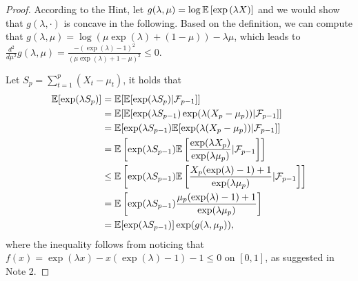 \begin{proof}

    According to the Hint, let $g(\lambda, \mu) = \log \mathbb{E} \left[\exp\left(\lambda X\right)\right]$ and we would show that $g(\lambda, \cdot)$ is concave in the following.
    Based on the definition, we can compute that $g(\lambda, \mu) = \log(\mu \exp(\lambda) + (1 - \mu)) - \lambda \mu$,
    which leads to $\frac{d^2}{d \mu^2} g(\lambda, \mu) = \frac{-(\exp(\lambda) - 1)^2}{(\mu \exp(\lambda) + 1 - \mu)^2} \leq 0$.

    Let $S_p = \sum_{t=1}^p (X_t - \mu_t)$, it holds that
    \begin{equation*}
        \begin{aligned}
            \mathbb{E}[\exp(\lambda S_p)]
            &= \mathbb{E}[\mathbb{E}[\exp(\lambda S_p) | \mathcal{F}_{p-1}]]\\
            &= \mathbb{E}[\mathbb{E}[\exp(\lambda S_{p-1}) \exp(\lambda(X_p - \mu_p)) | \mathcal{F}_{p-1}]]\\
            &= \mathbb{E}[\exp(\lambda S_{p-1}) \mathbb{E}[\exp(\lambda(X_p - \mu_p)) | \mathcal{F}_{p-1}]]\\
            &= \mathbb{E} \left[\exp(\lambda S_{p-1}) \mathbb{E} \left[ \frac{\exp(\lambda X_p)}{\exp(\lambda \mu_p)} | \mathcal{F}_{p-1} \right]\right]\\
            &\leq \mathbb{E} \left[\exp(\lambda S_{p-1}) \mathbb{E} \left[\frac{X_p (\exp(\lambda) - 1) + 1}{\exp(\lambda \mu_p)} | \mathcal{F}_{p-1}\right]\right]\\
            &= \mathbb{E} \left[\exp(\lambda S_{p-1}) \frac{\mu_p(\exp(\lambda) - 1) + 1}{\exp(\lambda \mu_p)}\right]\\
            &= \mathbb{E}[\exp(\lambda S_{p-1})] \exp(g(\lambda, \mu_p)),
        \end{aligned}
    \end{equation*}
    where the inequality follows from noticing that $f(x) = \exp(\lambda x) - x(\exp(\lambda) - 1) - 1 \leq 0$ on $[0, 1]$, as suggested in Note 2. 


\end{proof}
